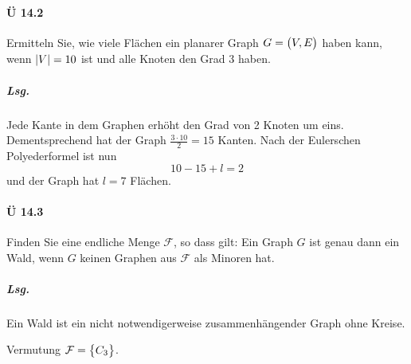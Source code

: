 \documentclass{scrreprt}
\begin{document}
\paragraph{Ü 14.2} Ermitteln Sie, wie viele Flächen ein planarer Graph
$G = \qty\big(V, E)$ haben kann, wenn $\abs{V} = 10$ ist und alle Knoten
den Grad 3 haben.

\subparagraph{Lsg.} Jede Kante in dem Graphen erhöht den Grad von 2 Knoten um
eins.
Dementsprechend hat der Graph $\frac{3 \cdot 10}{2} = 15$ Kanten.
Nach der Eulerschen Polyederformel ist nun
\[
  10 - 15 + l = 2
\]
und der Graph hat $l = 7$ Flächen.

\paragraph{Ü 14.3} Finden Sie eine endliche Menge $\mathcal{F}$, so dass gilt:
Ein Graph $G$ ist genau dann ein Wald, wenn $G$ keinen Graphen aus $\mathcal{F}$
als Minoren hat.

\subparagraph{Lsg.} Ein Wald ist ein nicht notwendigerweise zusammenhängender
Graph ohne Kreise.

Vermutung $\mathcal{F} = \qty\big{C_3}$.

\newpage
\end{document}
